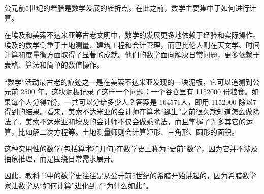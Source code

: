 公元前5世纪的希腊是数学发展的转折点。在此之前，数学主要集中于如何进行计算。

在埃及和美索不达米亚等古老文明中，数学的发展更多地依赖于经验和实际操作。埃及的数学侧重于土地测量、建筑工程和会计管理，而巴比伦人则在天文学、时间计算和度量衡方面取得了显著的成就。他们的数学面向解决日常问题，更多依赖于表格、算法和简单的数值操作。

“数学”活动最古老的痕迹之一是在美索不达米亚发现的一块泥板，它可以追溯到公元前 2500 年。这块泥板记录了这样一个问题：一个谷仓里有 1152000 份粮食。如果每个人分得7份，一共可以分给多少人？答案是 164571人，即用 1152000 除以7得到的结果。看来，美索不达米亚的会计师在算术“诞生”之前很久就知道怎么做除法了。美索不达米亚和埃及的会计师不仅会做乘除法，而且掌握了许多其它的运算，比如解二次方程等。土地测量师则会计算矩形、三角形、圆形的面积。

这种实用性的数学(包括算术和几何)在数学史上称为“史前”数学，因为它并不涉及抽象推理，而是围绕日常需求展开。
	
因此，教科书中的数学史往往是从公元前5世纪的希腊开始讲起的，因为希腊数学家让数学从“如何计算”进化到了“为什么如此”。

